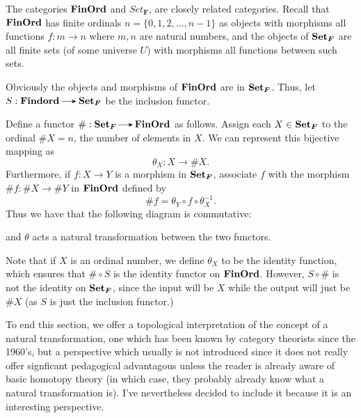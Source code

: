     \begin{example}
        The categories $\operatorname{\mathbf{FinOrd}}$ and
        $Set\bm{_F}$, are closely related categories. Recall
        that $\operatorname{\mathbf{FinOrd}}$ has finite ordinals $n = \{0, 1, 2,
        \dots, n-1 \}$ as objects with
        morphisms all functions $f: m \to n$ where $m, n$ are natural
        numbers, and the objects of $\operatorname{\mathbf{Set}}\bm{_F}$ are all
        finite sets  (of some universe $U$) with morphisms all
        functions between such sets. 

        Obviously the objects and morphisms of $\operatorname{\mathbf{FinOrd}}$ are in
        $\operatorname{\mathbf{Set}}\bm{_F}$. Thus, let $S : \textbf{Findord} \to
        \Set\bm{_F}$ be the inclusion functor.

        Define a functor $\#: \Set\bm{_F} \to \finord$
        as follows. Assign each $X \in \operatorname{\mathbf{Set}}\bm{_F}$ to the
        ordinal $\# X = n$, the number of elements in $X$. We can
        represent this bijective mapping as 
        \[
            \theta_X : X \to \#X.
        \]
        Furthermore, if $f: X \to Y$ is a morphism in
        $\operatorname{\mathbf{Set}}\bm{_F}$, associate $f$ with the morphism $\#f:
        \#X \to \#Y$ in $\operatorname{\mathbf{FinOrd}}$ defined by 
        \[
            \#f =\theta_Y \circ f \circ \theta_X^{-1}.
        \]
        Thus we have that the following diagram is commutative:
        \begin{center}
        \end{center}
        and $\theta$ acts a natural transformation between the
        two functors.

        Note that if $X$ is an ordinal number, we define $\theta_X$ to
        be the identity function, which ensures that $\# \circ S$ is
        the identity functor on $\operatorname{\mathbf{FinOrd}}$. However, $S \circ \#$
        is not the identity on $\operatorname{\mathbf{Set}}\bm{_F}$, since the input
        will be $X$ while the output will just be $\#X$ (as $S$ is
        just the inclusion functor.) 
    \end{example}

    To end this section, we offer a topological interpretation of the concept of 
    a natural transformation, one which has been known by category theorists since the 1960's,
    but a perspective which usually is not introduced since it does not really offer 
    signficant pedagogical advantagous unless the reader is already aware of basic homotopy theory (in which 
    case, they probably already know what a natural transformation is).
    I've nevertheless decided to include it because it is an interesting perspective.
    

